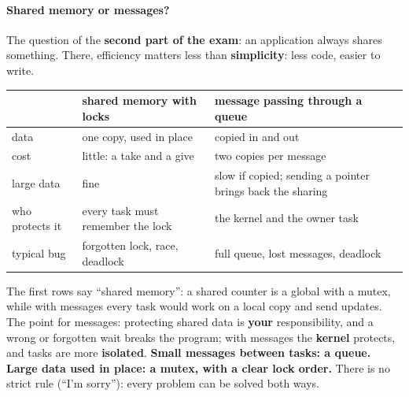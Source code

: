 \paragraph{Shared memory or messages?} The question of the \textbf{second part of the exam}: an application always shares something. There, efficiency matters less than \textbf{simplicity}: less code, easier to write.
\begin{center}
\small
\begin{tabular}{P{0.17} P{0.34} P{0.38}}
    \hline
    & \textbf{shared memory with locks} & \textbf{message passing through a queue} \\
    \hline
    data & one copy, used in place & copied in and out \\
    cost & little: a take and a give & two copies per message \\
    large data & fine & slow if copied; sending a pointer brings back the sharing \\
    who protects it & every task must remember the lock & the kernel and the owner task \\
    typical bug & forgotten lock, race, deadlock & full queue, lost messages, deadlock \\
    \hline
\end{tabular}
\end{center}
The first rows say ``shared memory'': a shared counter is a global with a mutex, while with messages every task would work on a local copy and send updates. The point for messages: protecting shared data is \textbf{your} responsibility, and a wrong or forgotten wait breaks the program; with messages the \textbf{kernel} protects, and tasks are more \textbf{isolated}. \textbf{Small messages between tasks: a queue. Large data used in place: a mutex, with a clear lock order.} There is no strict rule (``I'm sorry''): every problem can be solved both ways.

